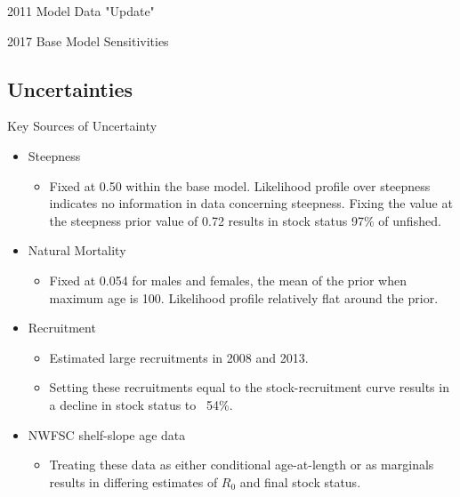 \documentclass[pdf]{beamer}\usepackage[]{graphicx}\usepackage[]{color}
\begin{document}
\begin{frame}{2011 Model Data "Update"}
  \begin{itemize}
  \end{itemize}
  \begin{center}
  \end{center}
\end{frame}

\begin{frame}{2017 Base Model Sensitivities}
\end{frame}


\subsection{Uncertainties}
\begin{frame}{Key Sources of Uncertainty}
  \begin{itemize}
    \item Steepness
    \begin{itemize}
      \item Fixed at 0.50 within the base model.  Likelihood profile over steepness indicates no information in data concerning steepness.  Fixing the value at the steepness prior value of 0.72 results in stock status 97\% of unfished.
    \end{itemize}
    \item Natural Mortality
      \begin{itemize}
        \item Fixed at 0.054 for males and females, the mean of the prior when maximum age is 100.  Likelihood profile relatively flat around the prior.
      \end{itemize}
    \item Recruitment 
      \begin{itemize} 
        \item Estimated large recruitments in 2008 and 2013. 
        \item Setting these recruitments equal to the stock-recruitment curve results in a decline in stock status to ~54\%.
      \end{itemize}
    \item{NWFSC shelf-slope age data}
      \begin{itemize}
        \item Treating these data as either conditional age-at-length or as marginals results in differing estimates of $R_0$ and final stock status.
      \end{itemize}
  \end{itemize}
\end{frame}
\end{document}
